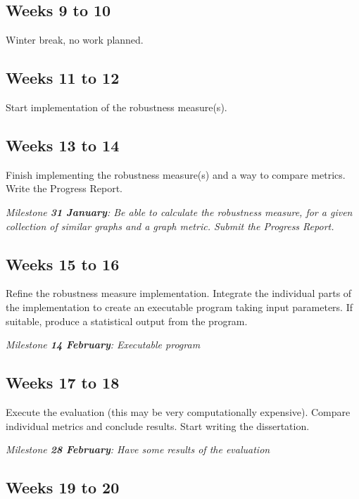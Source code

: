 \subsection*{Weeks 9 to 10}

Winter break, no work planned.


\subsection*{Weeks 11 to 12}

Start implementation of the robustness measure(s).


\subsection*{Weeks 13 to 14}

Finish implementing the robustness measure(s) and a way to compare metrics. Write the Progress Report.

\textit{Milestone \textbf{31 January}: Be able to calculate the robustness measure, for a given collection of similar graphs and a graph metric. Submit the Progress Report.}

\subsection*{Weeks 15 to 16}

Refine the robustness measure implementation. Integrate the individual parts of the implementation to create an executable program taking input parameters. If suitable, produce a statistical output from the program.

\textit{Milestone \textbf{14 February}: Executable program}

\subsection*{Weeks 17 to 18}

Execute the evaluation (this may be very computationally expensive). Compare individual metrics and conclude results. Start writing the dissertation.

\textit{Milestone \textbf{28 February}: Have some results of the evaluation}

\subsection*{Weeks 19 to 20}

